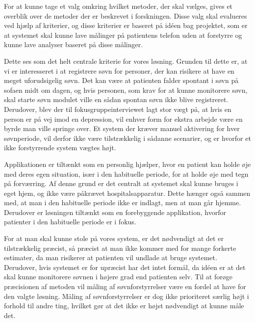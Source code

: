 For at kunne tage et valg omkring hvilket metoder, der skal vælges, gives et overblik over de metoder der er beskrevet i forskningen.
Disse valg skal evalueres ved hjælp af kriterier, og disse kriterier er baseret på idéen bag projektet, som er at systemet skal kunne lave målinger på patientens telefon uden at forstyrre og kunne lave analyser baseret på disse målinger. 

\begin{description}[style=nextline]
\item[Kriterie \#1: Undgå bruger intervention og måle søvn uden at forstyrre]
Dette ses som det helt centrale kriterie for vores løsning.
Grunden til dette er, at vi er interesseret i at registrere søvn for personer, der kan risikere at have en meget uforudsigelig søvn. 
Det kan være at patienten falder spontant i søvn på sofaen midt om dagen, og hvis personen, som krav for at kunne monitorere søvn, skal starte søvn modulet ville en sådan spontan søvn ikke blive registreret.
Derudover, blev der til fokusgruppeinterviewet \citep[Kapitel 1, Sektion 5]{misc:faellesrapp} lagt stor vægt på, at hvis en person er på vej imod en depression, vil enhver form for ekstra arbejde være en byrde man ville springe over.
Et system der kræver manuel aktivering for hver søvnperiode, vil derfor ikke være tilstrækkelig i sådanne scenarier, og er hvorfor et ikke forstyrrende system vægtes højt.

\item[Kriterie \#2: Kunne bruges af patienter i deres eget hjem]
Applikationen er tiltænkt som en personlig hjælper, hvor en patient kan holde øje med deres egen situation, især i den habituelle periode, for at holde øje med tegn på forværring.
Af denne grund er det centralt at systemet skal kunne bruges i eget hjem, og ikke være påkrævet hospitalsapparatur.
Dette hænger også sammen med, at man i den habituelle periode ikke er indlagt, men at man går hjemme.
Derudover er løsningen tiltænkt som en forebyggende applikation, hvorfor patienter i den habituelle periode er i fokus.

\item[Kriterie \#3: Være præcis]
For at man skal kunne stole på vores system, er det nødvendigt at det er tilstrækkelig præcist, så præcist at man ikke kommer med for mange forkerte estimater, da man risikerer at patienten vil undlade at bruge systemet. 
Derudover, hvis systemet er for upræcist har det intet formål, da idéen er at det skal kunne monitorere søvnen i højere grad end patienten selv.
Til at forøge præcisionen af metoden vil måling af søvnforstyrrelser være en fordel at have for den valgte løsning.
Måling af søvnforstyrrelser er dog ikke prioriteret særlig højt i forhold til andre ting, hvilket gør at det ikke er højst nødvendigt at kunne måle det.
\end{description}

